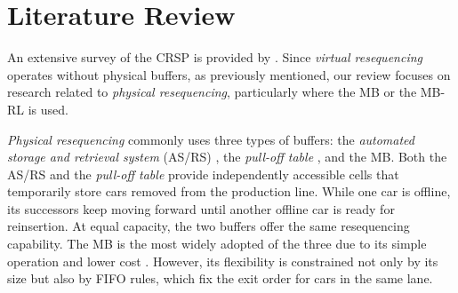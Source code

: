 \documentclass[12pt]{article}
\begin{document}



\section{Literature Review}
\label{sec2}
An extensive survey of the CRSP is provided by \citet{boysen2012resequencing}. Since \textit{virtual resequencing} operates without physical buffers, as previously mentioned, our review focuses on research related to \textit{physical resequencing}, particularly where the MB or the MB-RL is used.

\textit{Physical resequencing} commonly uses three types of buffers: the \textit{automated storage and retrieval system} (AS/RS) \citep{lubben2023online}, the \textit{pull-off table} \citep{boysen2011car}, and the MB. Both the AS/RS and the \textit{pull-off table} provide independently accessible cells that temporarily store cars removed from the production line. While one car is offline, its successors keep moving forward until another offline car is ready for reinsertion. At equal capacity, the two buffers offer the same resequencing capability. The MB is the most widely adopted of the three due to its simple operation and lower cost \citep{taube2018resequencing%
}. However, its flexibility is constrained not only by its size but also by FIFO rules, which fix the exit order for cars in the same lane.
\end{document}
